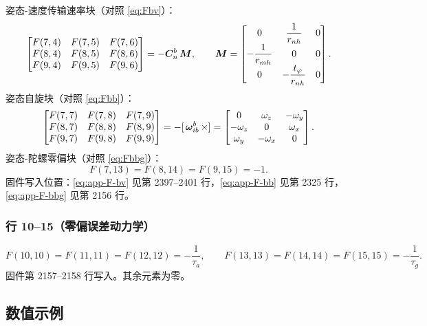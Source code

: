 姿态-速度传输速率块（对照 \cref{eq:Fbv}）：
\begin{equation}
  \begin{bmatrix}
    F(7,4) & F(7,5) & F(7,6) \\
    F(8,4) & F(8,5) & F(8,6) \\
    F(9,4) & F(9,5) & F(9,6)
  \end{bmatrix}
  = -\boldsymbol{C}_n^b\,\boldsymbol{M},
  \qquad
  \boldsymbol{M} =
  \begin{bmatrix}
    0 & \dfrac{1}{r_{nh}} & 0 \\[1.2ex]
    -\dfrac{1}{r_{mh}} & 0 & 0 \\[1.2ex]
    0 & -\dfrac{t_\varphi}{r_{nh}} & 0
  \end{bmatrix}.
  \label{eq:app-F-bv}
\end{equation}
姿态自旋块（对照 \cref{eq:Fbb}）：
\begin{equation}
  \begin{bmatrix}
    F(7,7) & F(7,8) & F(7,9) \\
    F(8,7) & F(8,8) & F(8,9) \\
    F(9,7) & F(9,8) & F(9,9)
  \end{bmatrix}
  = -[\,\boldsymbol{\omega}_{ib}^b\,\times]
  = \begin{bmatrix}
    0 & \omega_z & -\omega_y \\
    -\omega_z & 0 & \omega_x \\
    \omega_y & -\omega_x & 0
  \end{bmatrix}.
  \label{eq:app-F-bb}
\end{equation}
姿态-陀螺零偏块（对照 \cref{eq:Fbbg}）：
\begin{equation}
  F(7,13) = F(8,14) = F(9,15) = -1.
  \label{eq:app-F-bbg}
\end{equation}
固件写入位置：\cref{eq:app-F-bv} 见第 2397--2401 行，\cref{eq:app-F-bb}
见第 2325 行，\cref{eq:app-F-bbg} 见第 2156 行。

\subsubsection{行 10--15（零偏误差动力学）}

\begin{equation}
  F(10,10) = F(11,11) = F(12,12) = -\frac{1}{\tau_a}, \qquad
  F(13,13) = F(14,14) = F(15,15) = -\frac{1}{\tau_g}.
  \label{eq:app-F-bias}
\end{equation}
固件第 2157--2158 行写入。其余元素为零。

\subsection{数值示例}

